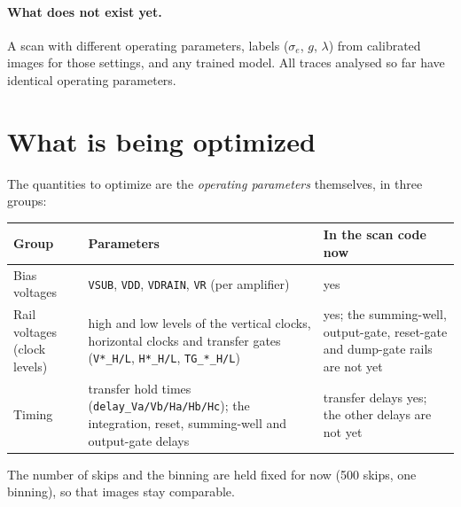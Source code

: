 \documentclass[11pt]{article}
\newcommand{\code}[1]{\texttt{#1}}
\begin{document}
\paragraph{What does not exist yet.} A scan with different operating parameters, labels ($\sigma_e$, $g$, $\lambda$) from calibrated
images for those settings, and any trained model. All traces analysed so far have identical operating parameters.

\section{What is being optimized}

The quantities to optimize are the \emph{operating parameters} themselves, in three groups:
\begin{center}
\begin{tabular}{p{}p{}p{}}
\toprule
Group & Parameters & In the scan code now \\
\midrule
Bias voltages & \code{VSUB}, \code{VDD}, \code{VDRAIN}, \code{VR} (per amplifier) & yes \\
Rail voltages (clock levels) & high and low levels of the vertical clocks, horizontal clocks and transfer gates (\code{V*\_H/L}, \code{H*\_H/L}, \code{TG\_*\_H/L}) & yes; the summing-well, output-gate, reset-gate and dump-gate rails are not yet \\
Timing & transfer hold times (\code{delay\_Va/Vb/Ha/Hb/Hc}); the integration, reset, summing-well and output-gate delays & transfer delays yes; the other delays are not yet \\
\bottomrule
\end{tabular}
\end{center}
The number of skips and the binning are held fixed for now (500 skips, one binning), so that images stay comparable.
\end{document}
